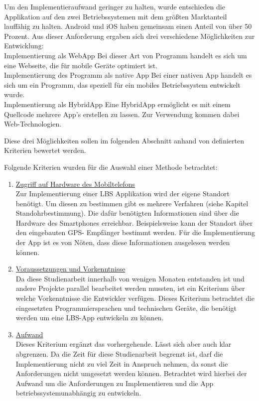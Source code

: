 Um den Implementieraufwand geringer zu halten, wurde entschieden die Applikation auf den zwei Betriebssystemen mit dem größten Marktanteil lauffähig zu halten. 
Android und iOS haben gemeinsam einen Anteil von über 50 Prozent. Aus dieser 
Anforderung ergaben sich drei verschiedene Möglichkeiten zur Entwicklung:
\\Implementierung als WebApp
Bei dieser Art von Programm handelt es sich um eine Webseite, die für mobile 
Geräte optimiert ist.
\\Implementierung des Programm als native App
Bei einer nativen App handelt es sich um ein Programm, das speziell für ein mobiles Betriebssystem entwickelt wurde.
\\Implementierung als HybridApp
Eine HybridApp ermöglicht es mit einem Quellcode mehrere App's erstellen zu lassen. 
Zur Verwendung kommen dabei Web-Technologien.

Diese drei Möglichkeiten sollen im folgenden Abschnitt anhand von definierten 
Kriterien bewertet werden.


Folgende Kriterien wurden für die Auswahl einer Methode betrachtet:
\begin{enumerate}
\item \underline{Zugriff auf Hardware des Mobiltelefons}
\\Zur Implementierung einer LBS Applikation wird der eigene Standort benötigt. Um 
diesen zu bestimmen gibt es mehrere Verfahren (siehe Kapitel Standohrbestimmung). 
Die dafür benötigten Informationen sind über die Hardware des 
Smartphones erreichbar. Beispielsweise kann der Standort über den eingebauten GPS-
Empfänger bestimmt werden. Für die Implementierung der App ist es von Nöten, dass 
diese Informationen ausgelesen werden können.

\item \underline{Voraussetzungen und Vorkenntnisse}
\\Da diese Studienarbeit innerhalb von wenigen Monaten entstanden ist und andere Projekte 
parallel bearbeitet werden mussten, ist ein Kriterium über welche Vorkenntnisse die 
Entwickler verfügen. Dieses Kriterium betrachtet die eingesetzten 
Programmiersprachen und technischen Geräte, die benötigt werden um eine LBS-App 
entwickeln zu können.


\item \underline{Aufwand}
\\Dieses Kriterium ergänzt das vorhergehende. Lässt sich aber auch klar abgrenzen. Da die Zeit für diese Studienarbeit begrenzt ist, darf die Implementierung nicht zu 
viel Zeit in Anspruch nehmen, da sonst die Anforderungen nicht umgesetzt werden 
können. Betrachtet wird hierbei der Aufwand um die Anforderungen zu 
Implementieren und die App betriebssystemunabhängig zu entwickeln.
\end{enumerate}

